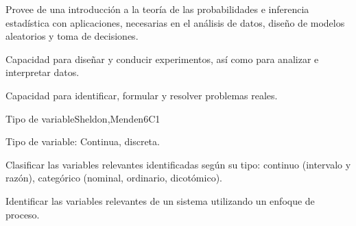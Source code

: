 
\begin{syllabus}


\begin{justification}
Provee de una introducción a la teoría de las probabilidades e inferencia estadística con aplicaciones, necesarias en el análisis de datos, diseño de modelos aleatorios y toma de decisiones.
\end{justification}

\begin{goals}
\item Capacidad para diseñar y conducir experimentos, así como para analizar e interpretar datos.
\item Capacidad para identificar, formular y resolver problemas reales.
\end{goals}

\begin{outcomes}
   \item {}
   \item {}
\end{outcomes}

\begin{competences}
    \item {} 
    \item {}
\end{competences}


\begin{unit}{Tipo de variable}{}{Sheldon,Menden}{6}{C1}
\begin{topics}
      \item Tipo de variable: Continua, discreta.
   \end{topics}

   \begin{learningoutcomes}
      \item Clasificar las variables relevantes identificadas según su tipo: continuo (intervalo y razón), categórico (nominal, ordinario, dicotómico).
      \item Identificar las variables relevantes de un sistema utilizando un enfoque de proceso.
   \end{learningoutcomes}
\end{unit}


\end{syllabus}
